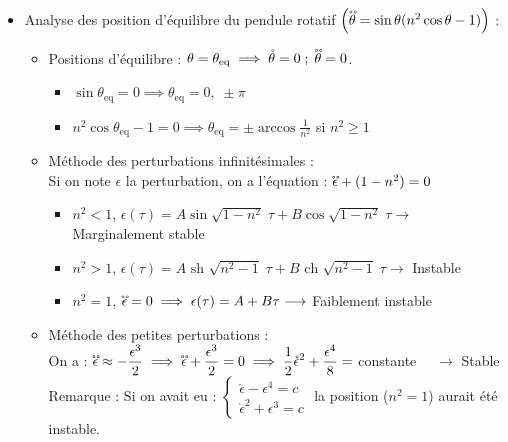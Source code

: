 \documentclass[a4paper]{article}
\newcommand\ringring[1]{%
  {%
   \mathop{\kern0pt #1}\limits^{%
     \vbox to-1.85ex{
       \kern-2ex %
       \hbox to 0pt{\hss\normalfont\kern.1em \r{}\kern-.45em \r{}\hss}%
       \vss %
     }%
   }%
  }%
}
\begin{document}
\begin{itemize}
\item Analyse des position d'équilibre du pendule rotatif $ \Big( \ringring{\theta} = \sin \theta (n^2 \cos \theta - 1) \Big) $ : 
\begin{itemize}
\item Positions d'équilibre : $ \theta = \theta_{\text{eq}} \implies \mathring{\theta} = 0 \; ; \; \ringring{\theta} = 0 $.
    \begin{itemize}
    \item $ \sin \theta_{\text{eq}} = 0 \implies \theta_{\text{eq}} = 0, \; \pm \pi $
    \item $ n^2 \cos \theta_{\text{eq}} - 1 = 0 \implies \theta_{\text{eq}} = \pm \arccos \frac{1}{n^2} $ si $ n^2 \geq 1 $
    \end{itemize}
\item Méthode des perturbations infinitésimales : \\
Si on note $ \epsilon $ la perturbation, on a l'équation : $ \ringring{\epsilon} + (1 - n^2) = 0 $
    \begin{itemize}
        \item $ n^2 < 1 $, \quad $ \epsilon(\tau) = A \sin \sqrt{1 - n^2} \; \tau + B \cos \sqrt{1 - n^2} \; \tau \longrightarrow $ Marginalement stable
        \item $ n^2 > 1 $, \quad $ \epsilon(\tau) = A \text{ sh } \sqrt{n^2 - 1} \; \tau + B \text{ ch } \sqrt{n^2 - 1} \; \tau \longrightarrow $ Instable
        \item $ n^2 = 1 $, \quad $ \ringring{\epsilon} = 0 \implies \epsilon(\tau) = A + B \tau \longrightarrow $ Faiblement instable
    \end{itemize}
\item Méthode des petites perturbations : \\
On a : $\displaystyle \ringring{\epsilon} \approx - \frac{\epsilon^3}{2} \implies \ringring{\epsilon} + \frac{\epsilon^3}{2} = 0 \implies \frac{1}{2} \mathring{\epsilon}^2 + \frac{\epsilon^4}{8} = $ constante $ \quad \longrightarrow $ Stable \\
Remarque : Si on avait eu : $ \begin{cases} \mathring{\epsilon} - \epsilon^4 = c \\ \mathring{\epsilon}^2 + \epsilon^3 = c \end{cases} $ \; la position ($ n^2 = 1 $) aurait été instable.
\end{itemize}






\end{itemize}
\end{document}
